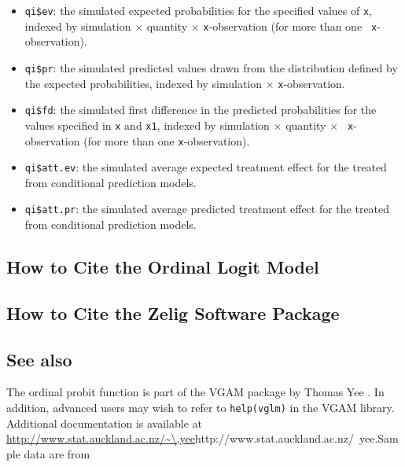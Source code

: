 \begin{itemize}
   \begin{itemize}
   \item {\tt qi\$ev}: the simulated expected probabilities for the
     specified values of {\tt x}, indexed by simulation $\times$
     quantity $\times$ {\tt x}-observation (for more than one {\tt
       x}-observation).
   \item {\tt qi\$pr}: the simulated predicted values drawn from the
     distribution defined by the expected probabilities, indexed by
     simulation $\times$ {\tt x}-observation.
   \item {\tt qi\$fd}: the simulated first difference in the predicted
     probabilities for the values specified in {\tt x} and {\tt x1},
     indexed by simulation $\times$ quantity $\times$ {\tt
       x}-observation (for more than one {\tt x}-observation).
   \item {\tt qi\$att.ev}: the simulated average expected treatment
     effect for the treated from conditional prediction models.  
   \item {\tt qi\$att.pr}: the simulated average predicted treatment
     effect for the treated from conditional prediction models.  
   \end{itemize}
\end{itemize}


\subsection*{How to Cite the Ordinal Logit Model}

\subsection*{How to Cite the Zelig Software Package}
\CiteZelig

\subsection*{See also}
The ordinal probit function is part of the VGAM package by Thomas Yee \citep{YeeHas03}. In addition, advanced users may wish to refer to \texttt{help(vglm)} 
in the VGAM library.  Additional documentation is available at
\url{http://www.stat.auckland.ac.nz/\~\,yee}{http://www.stat.auckland.ac.nz/~yee}.Sample data are from \cite{Martin92}


 
